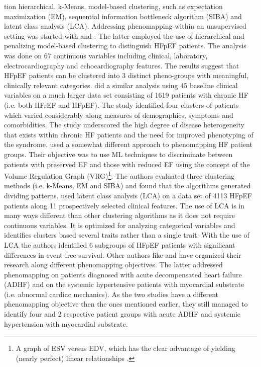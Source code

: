\documentclass[../thesis.tex]{subfiles}
\begin{document}
\noindent tion hierarchical, k-Means, model-based clustering, such as expectation maximization (EM), sequential information bottleneck algorithm (SIBA) and latent class analysis (LCA). Addressing phenomapping within an unsupervised setting was started with \cite{ahmad2014clinical} and \cite{shah2014phenomapping}. The latter employed the use of hierarchical and penalizing model-based clustering to distinguish HFpEF patients. The analysis was done on 67 continuous variables including clinical, laboratory, electrocardiography and echocardiography features. The results suggest that HFpEF patients can be clustered into 3 distinct pheno-groups with meaningful, clinically relevant categories. \cite{ahmad2014clinical} did a similar analysis using 45 baseline clinical variables on a much larger data set consisting of 1619 patients with chronic HF (i.e. both HFrEF and HFpEF). The study identified four clusters of patients which varied considerably along measures of demographics, symptoms and comorbidities. The study underscored the high degree of disease heterogeneity that exists within chronic HF patients and the need for improved phenotyping of the syndrome. \cite{alonso2015exploring} used a somewhat different approach to phenomapping HF patient groups. Their objective was to use ML techniques to discriminate between patients with preserved EF and those with reduced EF using the concept of the Volume Regulation Graph (VRG)\footnote{A graph of ESV versus EDV, which has the clear advantage of yielding (nearly perfect) linear relationships \citep{beringer1998unifying}.}. The authors evaluated three clustering methods (i.e. k-Means, EM and SIBA) and found that the algorithms generated dividing patterns. \cite{kao2015characterization} used latent class analysis (LCA) on a data set of 4113 HFpEF patients along 11 prospectively selected clinical features. The use of LCA is in many ways different than other clustering algorithms as it does not require continuous variables. It is optimized for analyzing categorical variables and identifies clusters based several traits rather than a single trait. With the use of LCA the authors identified 6 subgroups of HFpEF patients with significant differences in event-free survival. Other authors like \cite{katz2017phenomapping} and \cite{ahmad2016clinical} have organized their research along different phenomapping objectives. The latter addressed phenomapping on patients diagnosed with acute decompensated heart failure (ADHF) and \cite{katz2017phenomapping} on the systemic hypertensive patients with myocardial substrate (i.e. abnormal cardiac mechanics). As the two studies have a different phenomapping objective then the ones mentioned earlier, they still managed to identify four and 2 respective patient groups with acute ADHF and systemic hypertension with myocardial substrate.\\
\end{document}
